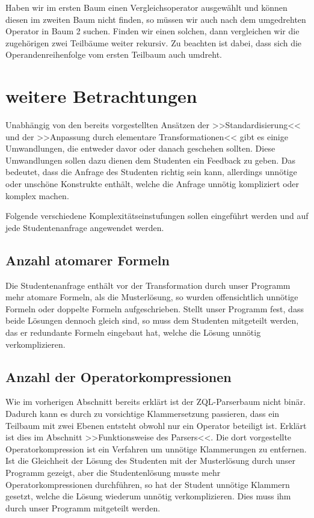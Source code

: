 Haben wir im ersten Baum einen Vergleichsoperator ausgewählt und können diesen im zweiten Baum nicht finden, so müssen wir auch nach dem umgedrehten Operator in Baum 2 suchen. Finden wir einen solchen, dann vergleichen wir die zugehörigen zwei Teilbäume weiter rekursiv. Zu beachten ist dabei, dass sich die Operandenreihenfolge vom ersten Teilbaum auch umdreht.

\section{weitere Betrachtungen}

Unabhängig von den bereits vorgestellten Ansätzen der >>Standardisierung<< und der >>Anpassung durch elementare Transformationen<< gibt es einige Umwandlungen, die entweder davor oder danach geschehen sollten. Diese Umwandlungen sollen dazu dienen dem Studenten ein Feedback zu geben. Das bedeutet, dass die Anfrage des Studenten richtig sein kann, allerdings unnötige oder unschöne Konstrukte enthält, welche die Anfrage unnötig kompliziert oder komplex machen.

Folgende verschiedene Komplexitätseinstufungen sollen eingeführt werden und auf jede Studentenanfrage angewendet werden.

\subsection{Anzahl atomarer Formeln}

Die Studentenanfrage enthält vor der Transformation durch unser Programm mehr atomare Formeln, als die Musterlösung, so wurden offensichtlich unnötige Formeln oder doppelte Formeln aufgeschrieben. Stellt unser Programm fest, dass beide Lösungen dennoch gleich sind, so muss dem Studenten mitgeteilt werden, das er redundante Formeln eingebaut hat, welche die Lösung unnötig verkomplizieren. 

\subsection{Anzahl der Operatorkompressionen}

Wie im vorherigen Abschnitt bereits erklärt ist der ZQL-Parserbaum nicht binär. Dadurch kann es durch zu vorsichtige Klammersetzung passieren, dass ein Teilbaum mit zwei Ebenen entsteht obwohl nur ein Operator beteiligt ist. Erklärt ist dies im Abschnitt >>Funktionsweise des Parsers<<. Die dort vorgestellte Operatorkompression ist ein Verfahren um unnötige Klammerungen zu entfernen. Ist die Gleichheit der Lösung des Studenten mit der Musterlösung durch unser Programm gezeigt, aber die Studentenlösung musste mehr Operatorkompressionen durchführen, so hat der Student unnötige Klammern gesetzt, welche die Lösung wiederum unnötig verkomplizieren. Dies muss ihm durch unser Programm mitgeteilt werden.

